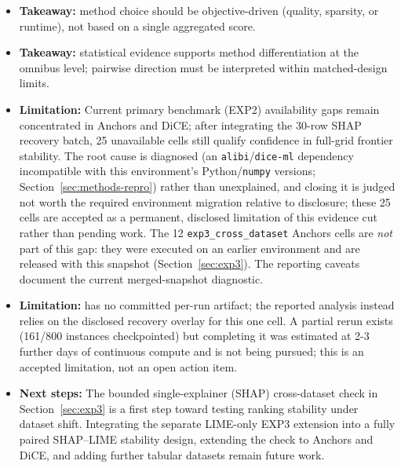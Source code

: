 \documentclass[twoside,11pt]{article}
\begin{document}
\begin{itemize}[leftmargin=*]
    \item \textbf{Takeaway:} method choice should be objective-driven (quality, sparsity, or runtime), not based on a single aggregated score.
    \item \textbf{Takeaway:} statistical evidence supports method differentiation at the omnibus level; pairwise direction must be interpreted within matched-design limits.
    \item \textbf{Limitation:} Current primary benchmark (EXP2) availability gaps remain concentrated in Anchors and DiCE; after integrating the 30-row SHAP recovery batch, 25 unavailable cells still qualify confidence in full-grid frontier stability. The root cause is diagnosed (an \texttt{alibi}/\texttt{dice-ml} dependency incompatible with this environment's Python/\texttt{numpy} versions; Section~\ref{sec:methods-repro}) rather than unexplained, and closing it is judged not worth the required environment migration relative to disclosure; these 25 cells are accepted as a permanent, disclosed limitation of this evidence cut rather than pending work. The 12 \texttt{exp3\_cross\_dataset} Anchors cells are \emph{not} part of this gap: they were executed on an earlier environment and are released with this snapshot (Section~\ref{sec:exp3}). The reporting caveats document the current merged-snapshot diagnostic.
    \item \textbf{Limitation:}  has no committed per-run artifact; the reported analysis instead relies on the disclosed  recovery overlay for this one cell. A partial rerun exists (161/800 instances checkpointed) but completing it was estimated at 2-3 further days of continuous compute and is not being pursued; this is an accepted limitation, not an open action item.
    \item \textbf{Next steps:} The bounded single-explainer (SHAP) cross-dataset check in Section~\ref{sec:exp3} is a first step toward testing ranking stability under dataset shift. Integrating the separate LIME-only EXP3 extension into a fully paired SHAP--LIME stability design, extending the check to Anchors and DiCE, and adding further tabular datasets remain future work.
\end{itemize}

\end{document}
